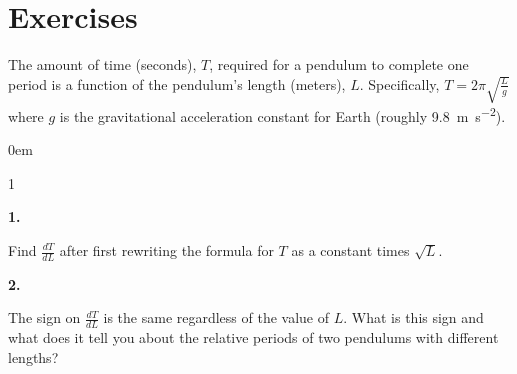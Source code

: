 \documentclass[12pt,]{book}
\theoremstyle{plain}
\theoremstyle{definition}
\numberwithin{equation}{section}
\newenvironment{exercisegroup}%
{\medskip\noindent}%
{\par\bigskip}%
\newlength{\exercisegroupindent}%
\newlength{\exercisegroupitemwidth}%
\newenvironment{exercisegrouplist}%
{\vspace{-\partopsep}%
\begin{adjustwidth}{\exercisegroupindent}{0em}}%
{\end{adjustwidth}%
\vspace{-\partopsep}%
\vspace{\baselineskip}}%
\newenvironment{exercisegroupbycol}[1]%
{\begin{exercisegrouplist}%
\vspace{-\multicolsep}%
\begin{multicols}{#1}%
\setlength{\parindent}{0em}%
\setlength{\exercisegroupitemwidth}{\linewidth}}%
{\end{multicols}%
\vspace{-\multicolsep}%
\end{exercisegrouplist}}%
\newenvironment{exercisegroupitem}[1]%
{\begin{minipage}[t]{\exercisegroupitemwidth}
\vspace{0pt}%
{\bfseries#1}%
\rule{0pt}{\baselineskip}}{\strut%
\end{minipage}%
\hspace{\columnsep}}%
\providecommand\phantomsection{}
\newcommand{\lz}[2]{\frac{d#1}{d#2}}
\begin{document}
\section*{Exercises}\label{exercises-37}

\begin{exercisegroup}%
The amount of time (seconds), \(T\), required for a pendulum to complete one period is a function of the pendulum's length (meters), \(L\).  Specifically, \(T=2\pi\sqrt{\frac{L}{g}}\) where \(g\) is the gravitational acceleration constant for Earth (roughly \SI{9.8}{\meter\per\second\tothe{2}}).%
\begin{exercisegroupbycol}{1}%
\begin{exercisegroupitem}{1. }\phantomsection\hypertarget{exercise-272}{\null}
Find \(\lz{T}{L}\) after first rewriting the formula for \(T\) as a constant times \(\sqrt{L}\).%
\end{exercisegroupitem}%
\par%
\begin{exercisegroupitem}{2. }\phantomsection\hypertarget{exercise-273}{\null}
The sign on \(\lz{T}{L}\) is the same regardless of the value of \(L\).  What is this sign and what does it tell you about the relative periods of two pendulums with different lengths?%
\end{exercisegroupitem}%
\par%
\end{exercisegroupbycol}%
\end{exercisegroup}%
\end{document}
